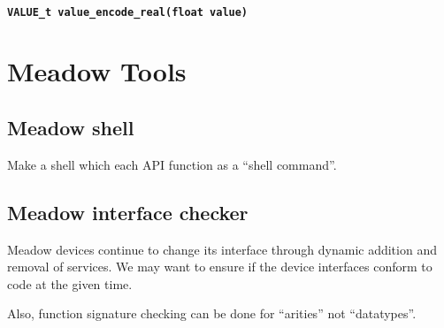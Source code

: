 \documentclass{note}
\begin{document}
\paragraph{\small\textcolor{red2}{\tt{}VALUE\_t value\_encode\_real(float value)}}

\section{Meadow Tools}
\subsection{Meadow shell}
Make a shell which each API function as a ``shell command''.

\subsection{Meadow interface checker}
Meadow devices continue to change its interface through dynamic addition and
removal of services. We may want to ensure if the device interfaces conform to
code at the given time.

Also, function signature checking can be done for ``arities'' not
``datatypes''. 


  


  
\end{document}
